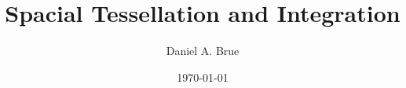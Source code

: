 \documentclass[preprint]{revtex4}
\begin{document}
\title{Spacial Tessellation and Integration}
\author{Daniel A. Brue}
\date{\today}
\maketitle
\end{document}
